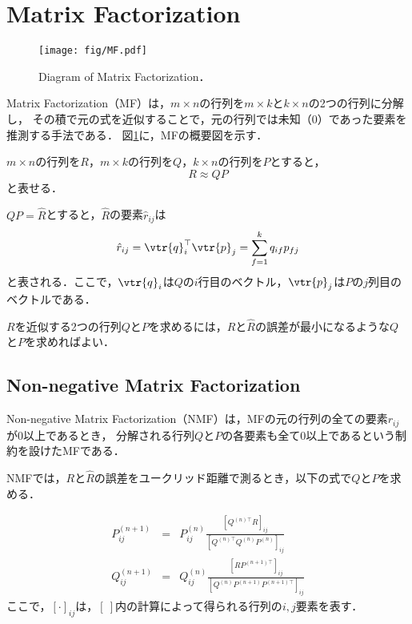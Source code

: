 \section{Matrix Factorization}
\begin{figure}[t]
  \centering \texttt{[image: fig/MF.pdf]}
  \caption{Diagram of Matrix Factorization．}
  \label{fig:MF}
\end{figure}

Matrix Factorization（MF）は，$m \times n$の行列を$m \times k$と$k \times n$の2つの行列に分解し，
その積で元の式を近似することで，元の行列では未知（0）であった要素を推測する手法である\cite{Koren:2009:MFT:1608565.1608614}．
図\ref{fig:MF}に，MFの概要図を示す．

$m \times n$の行列を$R$，$m \times k$の行列を$Q$，$k \times n$の行列を$P$とすると，
\begin{equation}
  R \approx QP
\end{equation}
と表せる．

$QP=\hat{R}$とすると，$\hat{R}$の要素$\hat{r}_{ij}$は
\begin{equation}
  \hat{r}_{ij} = \vtr{q}_{i}^{\top} \vtr{p}_{j} = \sum_{f=1}^{k} q_{if} p_{fj}
\end{equation}
と表される．ここで，$\vtr{q}_{i}$は$Q$の$i$行目のベクトル，$\vtr{p}_{j}$は$P$の$j$列目のベクトルである．

$R$を近似する2つの行列$Q$と$P$を求めるには，$R$と$\hat{R}$の誤差が最小になるような$Q$と$P$を求めればよい．

\subsection{Non-negative Matrix Factorization}
Non-negative Matrix Factorization（NMF）は，MFの元の行列の全ての要素$r_{ij}$が0以上であるとき，
分解される行列$Q$と$P$の各要素も全て0以上であるという制約を設けたMFである\cite{NIPS2000_1861}．

NMFでは，$R$と$\hat{R}$の誤差をユークリッド距離で測るとき，以下の式で$Q$と$P$を求める．

\begin{eqnarray}
  P_{ij}^{(n+1)} &=& P_{ij}^{(n)} \frac{\left[ Q^{(n)\top} R \right]_{ij}}{\left[ Q^{(n)\top} Q^{(n)} P^{(n)} \right]_{ij}} \\
  Q_{ij}^{(n+1)} &=& Q_{ij}^{(n)} \frac{\left[ R P^{(n+1)\top} \right]_{ij}}{\left[ Q^{(n)} P^{(n+1)} P^{(n+1)\top} \right]_{ij}}
\end{eqnarray}
ここで，$\left[ \cdot \right]_{ij}$は，$\left[ \  \right]$内の計算によって得られる行列の$i,j$要素を表す．


